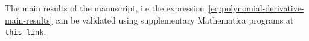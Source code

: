 ﻿The main results of the manuscript, i.e the expression~\eqref{eq:polynomial-derivative-main-results} can be validated
using supplementary Mathematica programs at
\href{https://github.com/kolosovpetro/FindingTheDerivativeOfPolynomialsViaDoubleLimit}
{\texttt{this link}}.
